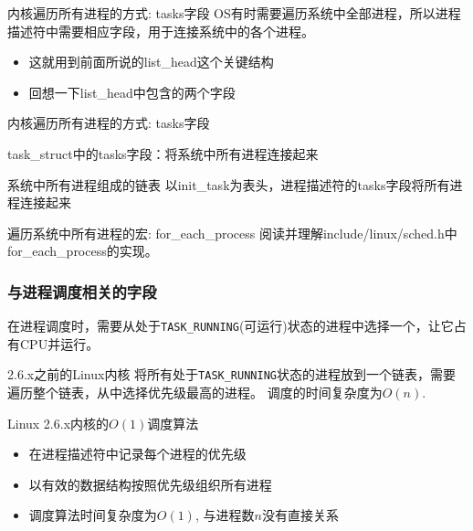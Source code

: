\documentclass[xcolor=svgnames]{beamer}
\begin{document}
\begin{CJK*}{UTF8}{gbsn}

\begin{frame}{内核遍历所有进程的方式: tasks字段}
OS有时需要遍历系统中全部进程，所以进程描述符中需要相应字段，用于连接系统中的各个进程。
\begin{itemize}
\item 这就用到前面所说的list\_head这个关键结构
\item 回想一下list\_head中包含的两个字段
\end{itemize}
\end{frame}

\begin{frame}{内核遍历所有进程的方式: tasks字段}
\begin{block}{task\_struct中的tasks字段：将系统中所有进程连接起来} 
\lsttasks
\end{block}
\begin{block}{系统中所有进程组成的链表}
以init\_task为表头，进程描述符的tasks字段将所有进程连接起来
\end{block}
\begin{block}{遍历系统中所有进程的宏: for\_each\_process}
阅读并理解include/linux/sched.h中for\_each\_process的实现。
\end{block}
\end{frame}

\begin{frame}[fragile]
\frametitle{与进程调度相关的字段}
在进程调度时，需要从处于\verb|TASK_RUNNING|(可运行)状态的进程中选择一个，让它占有CPU并运行。
\begin{block}{2.6.x之前的Linux内核}
将所有处于\verb|TASK_RUNNING|状态的进程放到一个链表，需要遍历整个链表，从中选择优先级最高的进程。
调度的时间复杂度为$O(n)$.
\end{block}
\begin{block}{Linux 2.6.x内核的$O(1)$调度算法}
\begin{itemize}
\item 在进程描述符中记录每个进程的优先级
\item 以有效的数据结构按照优先级组织所有进程
\item 调度算法时间复杂度为$O(1)$, 与进程数$n$没有直接关系
\end{itemize}
\end{block}
\end{frame}


\end{CJK*}
\end{document}
